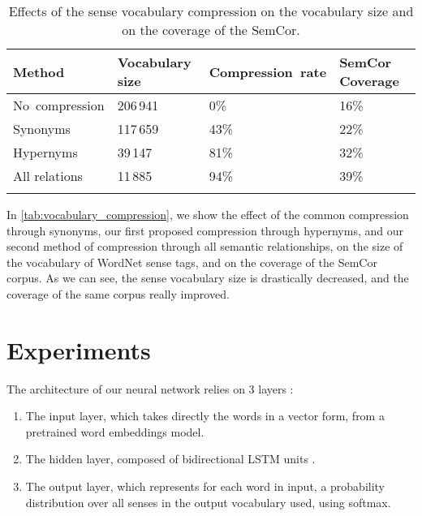 \documentclass[11pt]{article}
\newcommand{\citep}[1]{\cite{#1}}
\begin{document}
\begin{table}[htbp]
\small
\begin{center}
\tabulinesep=3pt
\begin{tabu} to \linewidth {|X[2.9lm]|X[1.9cm]|X[1.8cm]|X[1.8cm]|} \firsthline
Method & Vocabulary size & Compres\-sion~rate & SemCor Coverage  \\
\hline
No~compression & 206\,941 & 0\% & 16\% \\
Synonyms & 117\,659 & 43\% & 22\% \\
Hypernyms & 39\,147 & 81\% & 32\% \\
All relations & 11\,885 & 94\% & 39\% \\
\lasthline
\end{tabu}
\end{center}
\caption{Effects of the sense vocabulary compression on the vocabulary size and on the coverage of the SemCor.}
\label{tab:vocabulary_compression}
\end{table}

In \autoref{tab:vocabulary_compression}, we show the effect of the common compression through synonyms,
our first proposed compression through hypernyms, and our second method of compression through all semantic relationships, on the size of the vocabulary of WordNet sense tags, and on the coverage of the SemCor corpus. 
As we can see, the sense vocabulary size is drastically decreased, and the coverage of the same corpus really improved.


\section{Experiments}









\iffalse
The architecture of our neural network relies on 3 layers :

\begin{enumerate}[leftmargin=*,topsep=0pt,itemsep=0pt,parsep=0pt,partopsep=0pt]
    \item The input layer, which takes directly the words in a vector form, from a pretrained word embeddings model.
    \item The hidden layer, composed of bidirectional LSTM units \citep{LSTM1997}. 
    \item The output layer, which represents for each word in input, a probability distribution over all senses in the output vocabulary used, using softmax.
\end{enumerate}
\end{document}
